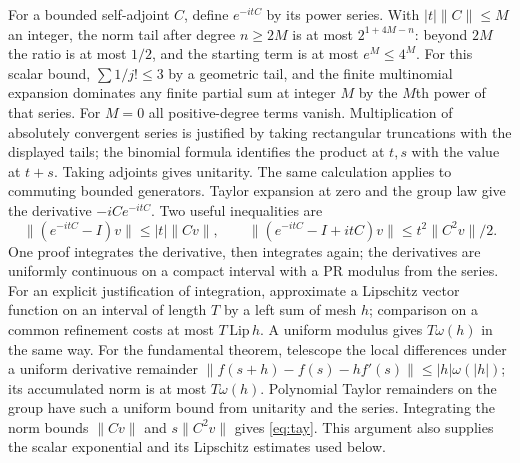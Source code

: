 For a bounded self-adjoint $C$, define $e^{-itC}$ by its power series. With $|t|\|C\|\le M$ an integer, the norm tail after degree $n\ge 2M$ is at most $2^{1+4M-n}$: beyond $2M$ the ratio is at most $1/2$, and the starting term is at most $e^M\le 4^M$. For this scalar bound, $\sum 1/j!\le3$ by a geometric tail, and the finite multinomial expansion dominates any finite partial sum at integer $M$ by the $M$th power of that series. For $M=0$ all positive-degree terms vanish. Multiplication of absolutely convergent series is justified by taking rectangular truncations with the displayed tails; the binomial formula identifies the product at $t,s$ with the value at $t+s$. Taking adjoints gives unitarity. The same calculation applies to commuting bounded generators. Taylor expansion at zero and the group law give the derivative $-iCe^{-itC}$. Two useful inequalities are
\begin{equation}
 \|(e^{-itC}-I)v\|\le |t|\|Cv\|,\qquad
 \|(e^{-itC}-I+itC)v\|\le t^2\|C^2v\|/2.\label{eq:tay}
\end{equation}
One proof integrates the derivative, then integrates again; the derivatives are uniformly continuous on a compact interval with a PR modulus from the series. For an explicit justification of integration, approximate a Lipschitz vector function on an interval of length $T$ by a left sum of mesh $h$; comparison on a common refinement costs at most $T\,\mathrm{Lip}\, h$. A uniform modulus gives $T\omega(h)$ in the same way. For the fundamental theorem, telescope the local differences under a uniform derivative remainder $\|f(s+h)-f(s)-hf'(s)\|\le |h|\omega(|h|)$; its accumulated norm is at most $T\omega(h)$. Polynomial Taylor remainders on the group have such a uniform bound from unitarity and the series. Integrating the norm bounds $\|Cv\|$ and $s\|C^2v\|$ gives \eqref{eq:tay}. This argument also supplies the scalar exponential and its Lipschitz estimates used below.

